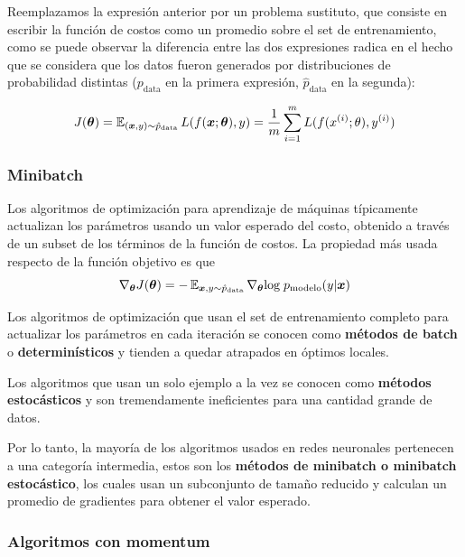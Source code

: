 Reemplazamos la expresión anterior por un problema sustituto, que consiste en escribir la funci\'on de costos como un promedio sobre el set de entrenamiento, como se puede observar la diferencia entre las dos expresiones radica en el hecho que se considera que los datos fueron generados por distribuciones de probabilidad distintas (${p}_{\textrm{data}}$ en la primera expresión, $\hat{p}_{\textrm{data}}$ en la segunda):

\begin{equation}
J(\bm{\theta}) = \operatorname{\mathbb{E}}_{(\bm{x},y)\sim \hat{p}_{\textrm{data}}}L(f(\bm{x};\bm{\theta}),y) = \frac{1}{m}\sum_{i=1}^m L(f(x^{(i)};\theta),y^{(i)})
\end{equation}

\subsubsection{Minibatch}

Los algoritmos de optimización para aprendizaje de máquinas típicamente actualizan los parámetros usando un valor esperado del costo, obtenido a través de un subset de los términos de la función de costos. La propiedad más usada respecto de la función objetivo es que 
\begin{equation*}
\nabla_{\bm{\theta}}J(\bm{\theta}) = -\operatorname{\mathbb{E}}_{\bm{x},y\sim \hat{p}_{\textrm{data}}}\nabla_{\bm{\theta}}\textrm{log}\; p_{\textrm{modelo}}(y|\bm{x})
\end{equation*} 

Los algoritmos de optimización que usan el set de entrenamiento completo para actualizar los parámetros en cada iteración se conocen como \textbf{métodos de batch} o \textbf{determinísticos} y tienden a quedar atrapados en óptimos locales. 

Los algoritmos que usan un solo ejemplo a la vez se conocen como \textbf{métodos estocásticos} y son tremendamente ineficientes para una cantidad grande de datos.  

Por lo tanto, la mayoría de los algoritmos usados en redes neuronales pertenecen a una categoría intermedia, estos son los \textbf{métodos de minibatch o minibatch estocástico}, los cuales usan un subconjunto de tamaño reducido y calculan un promedio de gradientes para obtener el valor esperado.

\subsubsection{Algoritmos con momentum}

